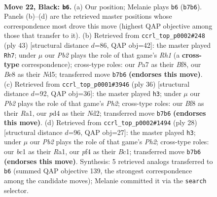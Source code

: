 \documentclass[11pt]{article}
\begin{document}
\clearpage

\begin{figure}[p]\centering
\begin{subfigure}{0.46\textwidth}\centering
\resizebox{\linewidth}{!}{%
\newchessgame
\chessboard[
  setfen={2krbbn1/pp4r1/4p1p1/nP1pP1Pp/P2P1P2/4K3/3N4/RNB2B1R b - - 4 22},
  showmover=false,
  pgfstyle=straightmove, color=movearrow, markmove={b7-b6}
]}
\caption{}
\end{subfigure}\hfill
\begin{subfigure}{0.46\textwidth}\centering
\resizebox{\linewidth}{!}{%
\newchessgame
\chessboard[
  setfen={2kr1b1r/1bp5/pp6/3nPp1p/P1N2Pp1/2PP4/3B1KPP/R3NR2 b - - 2 22},
  showmover=false,
  pgfstyle=straightmove, color=movearrow, markmove={h8-h7}
]}
\caption{}
\end{subfigure}
\\[4pt]
\begin{subfigure}{0.46\textwidth}\centering
\resizebox{\linewidth}{!}{%
\newchessgame
\chessboard[
  setfen={r3k2r/pp2bp2/2p1p1n1/3pP3/3P1PBn/2P5/PP1N3P/R1B2RK1 w kq - 3 19},
  showmover=false,
  pgfstyle=straightmove, color=movearrow, markmove={h2-h3}
]}
\caption{}
\end{subfigure}\hfill
\begin{subfigure}{0.46\textwidth}\centering
\resizebox{\linewidth}{!}{%
\newchessgame
\chessboard[
  setfen={r1b1kb1r/1pp2ppp/p1p3n1/P3P3/3N4/2N2P2/1PP3PP/R1BR2K1 w - - 1 15},
  showmover=false,
  pgfstyle=straightmove, color=movearrow, markmove={h2-h3}
]}
\caption{}
\end{subfigure}
\caption{\textbf{Move 22, Black: \texttt{b6}.} (a) Our position; Melanie plays \texttt{b6} (\texttt{b7b6}). Panels (b)--(d) are the retrieved master positions whose correspondence most drove this move (highest QAP objective among those that transfer to it). (b) Retrieved from \texttt{ccrl\_top\_p0002\#248} (ply 43) [structural distance $d$=86, QAP obj=42]: the master played \texttt{Rh7}; under $\mu$ our \emph{Pb2} plays the role of that game's \emph{Rh1} (a \textbf{cross-type} correspondence); cross-type roles: our \emph{P}a7 as their \emph{B}f8, our \emph{B}e8 as their \emph{N}d5; transferred move \texttt{b7b6} \textbf{(endorses this move)}. (c) Retrieved from \texttt{ccrl\_top\_p0001\#3946} (ply 36) [structural distance $d$=92, QAP obj=36]: the master played \texttt{h3}; under $\mu$ our \emph{Pb2} plays the role of that game's \emph{Ph2}; cross-type roles: our \emph{B}f8 as their \emph{R}a1, our \emph{p}d4 as their \emph{N}d2; transferred move \texttt{b7b6} \textbf{(endorses this move)}. (d) Retrieved from \texttt{ccrl\_top\_p0002\#1494} (ply 28) [structural distance $d$=96, QAP obj=27]: the master played \texttt{h3}; under $\mu$ our \emph{Pb2} plays the role of that game's \emph{Ph2}; cross-type roles: our \emph{b}c1 as their \emph{R}a1, our \emph{p}f4 as their \emph{B}c1; transferred move \texttt{b7b6} \textbf{(endorses this move)}. Synthesis: 5 retrieved analogs transferred to \texttt{b6} (summed QAP objective 139, the strongest correspondence among the candidate moves); Melanie committed it via the \texttt{search} selector.}
\label{fig:thought-m43}
\end{figure}
\end{document}
